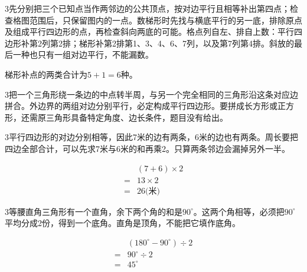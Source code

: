 \documentclass[multi=snippet,border={5bp 20bp 5bp 5bp}]{standalone}
\newenvironment{snippet}[3]{\begin{minipage}{#1bp}\color{answerred}\fontsize{#2}{#3}\selectfont\raggedright}{\end{minipage}}
\begin{document}
\begin{snippet}{505}{11.5}{14}\begin{multicols}{3}\raggedcolumns 先分别把三个已知点当作两邻边的公共顶点，按对边平行且相等补出第四点；检查格图范围后，只保留图内的一点。数梯形时先找与横底平行的另一底，排除原点及组成平行四边形的点，再检查斜向两底的可能。格点列自左、排自上数：平行四边形补第2列第2排；梯形补第2排第1、3、4、6、7列，以及第7列第4排。斜放的最后一种也只有一组对边平行，不能漏数。\par 梯形补点的两类合计为\(5+1=6\)\allowbreak 种。\end{multicols}\end{snippet}
\begin{snippet}{505}{11.5}{14}\begin{multicols}{3}\raggedcolumns 把一个三角形绕一条边的中点转半周，与另一个完全相同的三角形沿这条对应边拼合。外边界的两组对边分别平行，必定构成平行四边形。要拼成长方形或正方形，还需原三角形具备特定角度、边长条件，题目没有给出。\end{multicols}\end{snippet}
\begin{snippet}{505}{11.5}{14}\begin{multicols}{3}\raggedcolumns 平行四边形的对边分别相等，因此7米的边有两条，6米的边也有两条。周长要把四边全部合计，可以先求7米与6米的和再乘2。只算两条邻边会漏掉另外一半。\par \[\begin{aligned}&(7+6)\times2\\={}&13\times2\\={}&26\text{(米)}\end{aligned}\]\end{multicols}\end{snippet}
\begin{snippet}{505}{11.5}{14}\begin{multicols}{3}\raggedcolumns 等腰直角三角形有一个直角，余下两个角的和是\(90^\circ\)\allowbreak 。这两个角相等，必须把\(90^\circ\)\allowbreak 平均分成2份，得到一个底角。直角是顶角，不能把它填作底角。\par \[\begin{aligned}&(180^\circ-90^\circ)\div2\\={}&90^\circ\div2\\={}&45^\circ\end{aligned}\]\end{multicols}\end{snippet}
\end{document}
